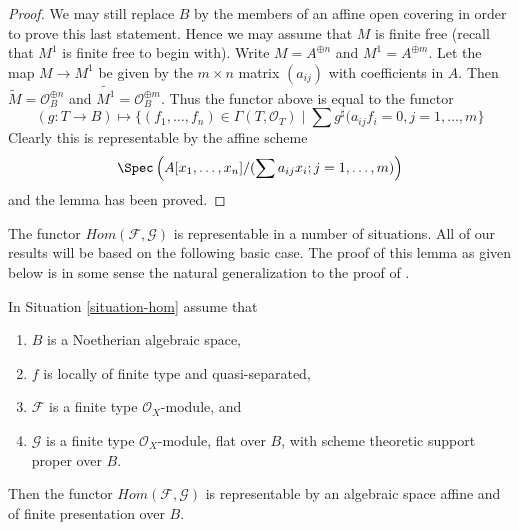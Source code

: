 \begin{proof}
\medskip\noindent
We may still replace $B$ by the members of an affine open covering
in order to prove this last statement. Hence we may assume that $M$
is finite free (recall that $M^1$ is finite free to begin with).
Write $M = A^{\oplus n}$ and $M^1 = A^{\oplus m}$. Let the map
$M \to M^1$ be given by the $m \times n$ matrix $(a_{ij})$ with
coefficients in $A$. Then $\widetilde{M} = \mathcal{O}_B^{\oplus n}$
and $\widetilde{M^1} = \mathcal{O}_B^{\oplus m}$. Thus the functor
above is equal to the functor
$$
(g : T \to B) \longmapsto
\{(f_1, \ldots, f_n) \in \Gamma(T, \mathcal{O}_T) \mid
\sum g^\sharp(a_{ij}f_i = 0, j = 1, \ldots, m\}
$$
Clearly this is representable by the affine scheme
$$
\Spec\left(A[x_1, \ldots, x_n]/(\sum a_{ij}x_i; j = 1, \ldots, m)\right)
$$
and the lemma has been proved.
\end{proof}

\noindent
The functor $\mathit{Hom}(\mathcal{F}, \mathcal{G})$ is representable in a
number of situations. All of our results will be based on the following
basic case. The proof of this lemma as given below is in some sense the
natural generalization to the proof of \cite[III, Cor 7.7.8]{EGA}.

\begin{lemma}
\label{lemma-noetherian-hom}
In Situation \ref{situation-hom} assume that
\begin{enumerate}
\item $B$ is a Noetherian algebraic space,
\item $f$ is locally of finite type and quasi-separated,
\item $\mathcal{F}$ is a finite type $\mathcal{O}_X$-module, and
\item $\mathcal{G}$ is a finite type $\mathcal{O}_X$-module, flat over $B$,
with scheme theoretic support proper over $B$.
\end{enumerate}
Then the functor $\mathit{Hom}(\mathcal{F}, \mathcal{G})$ is
representable by an algebraic space affine and of finite presentation
over $B$.
\end{lemma}

